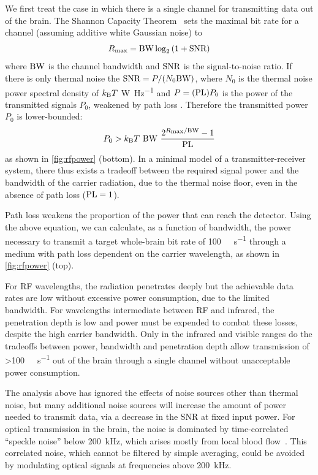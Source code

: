We first treat the case in which there is a single channel for transmitting data out of the brain. The Shannon Capacity Theorem~\cite{cover06} sets the maximal bit rate for a channel (assuming additive white Gaussian noise) to
\[R_{\text{\scriptsize max}} = \text{BW} \log_2 \left(1 + \text{SNR}\right)\]
where $\text{BW}$ is the channel bandwidth and $\text{SNR}$ is the signal-to-noise ratio.
If there is only thermal noise the $\text{SNR} = P/(N_0 \text{BW})$, where $N_0$ is the thermal noise power spectral density of $k_{\text{\scriptsize B}} T$ \si{\watt\per\hertz} and $P=(\text{PL})P_0$ is the power of the transmitted signals $P_0$, weakened by path loss \pathloss.
Therefore the transmitted power $P_0$ is lower-bounded:
\[P_0 > \kb T\ \BW\ \frac{2^{R\sub{max}/\BW}-1}{\pathloss}\]
as shown in \autoref{fig:rfpower} (bottom).
In a minimal model of a transmitter-receiver system, there thus exists a tradeoff between the required signal power and the bandwidth of the carrier radiation, due to the thermal noise floor, even in the absence of path loss ($\text{PL} = 1$).

Path loss weakens the proportion of the power that can reach the detector.
Using the above equation, we can calculate, as a function of bandwidth, the power necessary to transmit a target whole-brain bit rate of \SI{100}{\giga\bit\per\second} through a medium with path loss dependent on the carrier wavelength, as shown in \autoref{fig:rfpower} (top).

For RF wavelengths, the radiation penetrates deeply but the achievable data rates are low without excessive power consumption, due to the limited bandwidth.
For wavelengths intermediate between RF and infrared, the penetration depth is low and power must be expended to combat these losses, despite the high carrier bandwidth.
Only in the infrared and visible ranges do the tradeoffs between power, bandwidth and penetration depth allow transmission of \SI{>100}{\giga\bit\per\second} out of the brain through a single channel without unacceptable power consumption.

The analysis above has ignored the effects of noise sources other than thermal noise, but many additional noise sources will increase the amount of power needed to transmit data, via a decrease in the SNR at fixed input power.
For optical transmission in the brain, the noise is dominated by time-correlated ``speckle noise'' below \SI{200}{\kilo\hertz}, which arises mostly from local blood flow~\cite{carp11}.
This correlated noise, which cannot be filtered by simple averaging, could be avoided by modulating optical signals at frequencies above \SI{200}{\kHz}.

